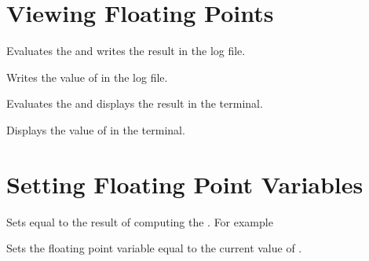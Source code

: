 \documentclass[oneside]{book}
\begin{document}
\section{Viewing Floating Points}

\begin{function}{\fpLog}
\begin{syntax}
 
\end{syntax}
Evaluates the  and writes the
result in the log file.
\end{function}

\begin{function}{\fpVarLog}
\begin{syntax}
 
\end{syntax}
Writes the value of  in the log file.
\end{function}

\begin{function}{\fpShow}
\begin{syntax}
 
\end{syntax}
Evaluates the  and displays the
result in the terminal.
\end{function}

\begin{function}{\fpVarShow}
\begin{syntax}
 
\end{syntax}
Displays the value of  in the terminal.
\end{function}

\section{Setting Floating Point Variables}

\begin{function}{\fpSet}
\begin{syntax}
  
\end{syntax}
Sets  equal to the result of computing the
. For example
\begin{demohigh}
\fpSet {}
\fpUse \lTmpaFp
\end{demohigh}
\end{function}

\begin{function}{\fpSetEq}
\begin{syntax}
  
\end{syntax}
Sets the floating point variable  equal to the current
value of .
\end{function}
\end{document}
